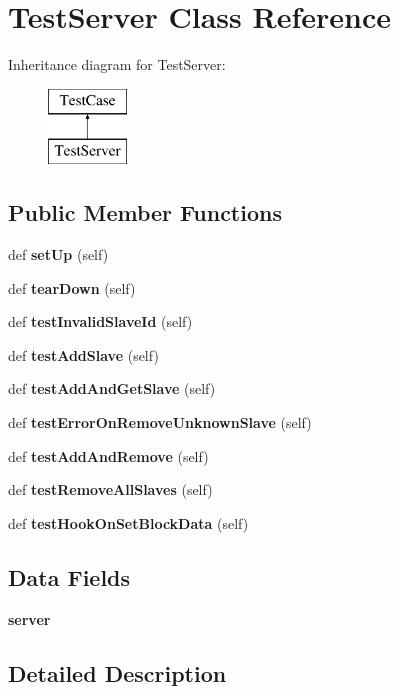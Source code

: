 \section{Test\+Server Class Reference}
\label{classtests_1_1unittest__modbus_1_1_test_server}
Inheritance diagram for Test\+Server\+:\begin{figure}[H]
\begin{center}
\leavevmode
\includegraphics[height=2.000000cm]{classtests_1_1unittest__modbus_1_1_test_server}
\end{center}
\end{figure}
\subsection*{Public Member Functions}
\begin{DoxyCompactItemize}
\item 
def {\bf set\+Up} (self)
\item 
def {\bf tear\+Down} (self)
\item 
def {\bf test\+Invalid\+Slave\+Id} (self)
\item 
def {\bf test\+Add\+Slave} (self)
\item 
def {\bf test\+Add\+And\+Get\+Slave} (self)
\item 
def {\bf test\+Error\+On\+Remove\+Unknown\+Slave} (self)
\item 
def {\bf test\+Add\+And\+Remove} (self)
\item 
def {\bf test\+Remove\+All\+Slaves} (self)
\item 
def {\bf test\+Hook\+On\+Set\+Block\+Data} (self)
\end{DoxyCompactItemize}
\subsection*{Data Fields}
\begin{DoxyCompactItemize}
\item 
{\bf server}
\end{DoxyCompactItemize}


\subsection{Detailed Description}


